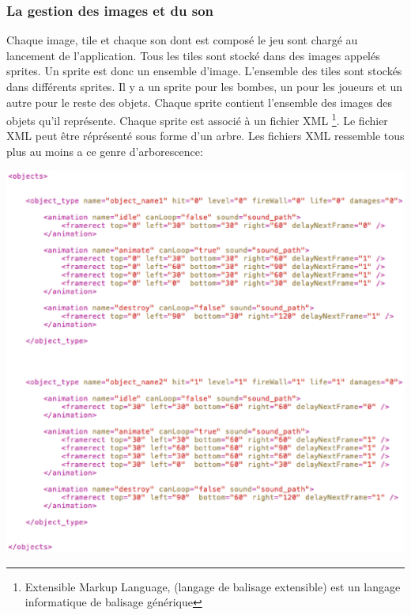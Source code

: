 		\subsubsection{La gestion des images et du son}
		
		Chaque image, tile et chaque son dont est composé le jeu sont chargé au lancement de l'application. Tous les tiles sont stocké dans des images appelés sprites. Un sprite est donc un ensemble d'image. L'ensemble des tiles sont stockés dans différents sprites. Il y a un sprite pour les bombes, un pour les joueurs et un autre pour le reste des objets. Chaque sprite contient l'ensemble des images des objets qu'il représente. Chaque sprite est associé à un fichier XML \footnote{ Extensible Markup Language, (langage de balisage extensible) est un langage informatique de balisage générique}. Le fichier XML peut être réprésenté sous forme d'un arbre. Les fichiers XML ressemble tous plus au moins a ce genre d'arborescence: 
		
		\includegraphics[width=15cm]{./Analyse/Img/exampleXmlBomberklob.eps}
		
